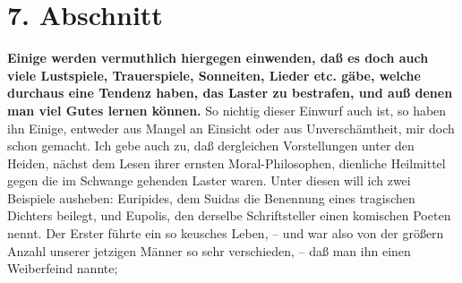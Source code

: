 \section{7. Abschnitt} \label{kap17_ab7}

\label{ref:17_07_einwand}
\textbf{Einige werden vermuthlich hiergegen einwenden, daß es doch auch viele
Lustspiele, Trauerspiele, Sonneiten, Lieder etc. gäbe, welche durchaus eine
Tendenz haben, das Laster zu bestrafen, und auß denen man viel Gutes lernen
können.} So nichtig dieser Einwurf auch ist, so haben ihn Einige, entweder aus
Mangel an Einsicht oder aus Unverschämtheit, mir doch schon gemacht. Ich gebe
auch zu, daß dergleichen Vorstellungen unter den Heiden, nächst dem Lesen ihrer
ernsten Moral-Philosophen, dienliche Heilmittel gegen die im Schwange gehenden
Laster waren. Unter diesen will ich zwei Beispiele ausheben:
Euripides, dem
Suidas die Benennung eines tragischen Dichters beilegt, und
Eupolis, den
derselbe Schriftsteller einen komischen Poeten nennt. Der Erster führte ein so
keusches Leben, -- und war also von der größern Anzahl unserer jetzigen Männer
so sehr verschieden, -- daß man ihn einen Weiberfeind nannte;

\medskip

